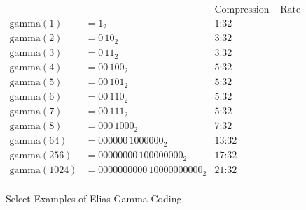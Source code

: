 \begin{figure}
	
	\centering
	\begin{align*}
						&		&\text{Compression}&\text{ Rate}\\
		\mathrm{gamma}(1) &= 1_2  &\text{1:32} \\
		\mathrm{gamma}(2) &= 0\,10_2 &\text{3:32} \\
		\mathrm{gamma}(3) &= 0\,11_2 &\text{3:32} \\
		\mathrm{gamma}(4) &= 00\,100_2 &\text{5:32} \\
		\mathrm{gamma}(5) &= 00\,101_2 &\text{5:32} \\
		\mathrm{gamma}(6) &= 00\,110_2 &\text{5:32} \\
		\mathrm{gamma}(7) &= 00\,111_2 &\text{5:32} \\
		\mathrm{gamma}(8) &= 000\,1000_2 &\text{7:32}\\
		\mathrm{gamma}(64) &= 000000\,1000000_2 &\text{13:32}\\
		\mathrm{gamma}(256) &= 00000000\,100000000_2 &\text{17:32} \\
		\mathrm{gamma}(1024) &= 0000000000\,10000000000_2 &\text{21:32} \\
	\end{align*}
	
	\caption{Select Examples of Elias Gamma Coding.}
	\label{fig:bg-comp-gamma-ex}
\end{figure}